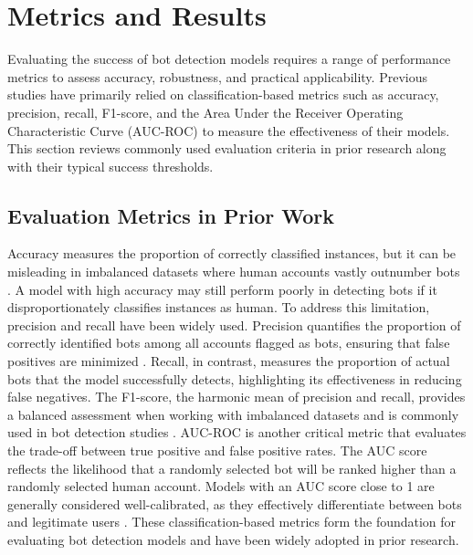 \documentclass[10pt,twocolumn]{article}
\begin{document}
\section{Metrics and Results}
Evaluating the success of bot detection models requires a range of performance metrics to assess accuracy, robustness, and practical applicability. Previous studies have primarily relied on classification-based metrics such as accuracy, precision, recall, F1-score, and the Area Under the Receiver Operating Characteristic Curve (AUC-ROC) to measure the effectiveness of their models. This section reviews commonly used evaluation criteria in prior research along with their typical success thresholds.

\subsection{Evaluation Metrics in Prior Work}
Accuracy measures the proportion of correctly classified instances, but it can be misleading in imbalanced datasets where human accounts vastly outnumber bots \cite{Heidari2021}. A model with high accuracy may still perform poorly in detecting bots if it disproportionately classifies instances as human. To address this limitation, precision and recall have been widely used. Precision quantifies the proportion of correctly identified bots among all accounts flagged as bots, ensuring that false positives are minimized \cite{Hayawi2023}. Recall, in contrast, measures the proportion of actual bots that the model successfully detects, highlighting its effectiveness in reducing false negatives. The F1-score, the harmonic mean of precision and recall, provides a balanced assessment when working with imbalanced datasets and is commonly used in bot detection studies \cite{Cai2017}. AUC-ROC is another critical metric that evaluates the trade-off between true positive and false positive rates. The AUC score reflects the likelihood that a randomly selected bot will be ranked higher than a randomly selected human account. Models with an AUC score close to 1 are generally considered well-calibrated, as they effectively differentiate between bots and legitimate users \cite{Hajli2021}. These classification-based metrics form the foundation for evaluating bot detection models and have been widely adopted in prior research.
\end{document}
